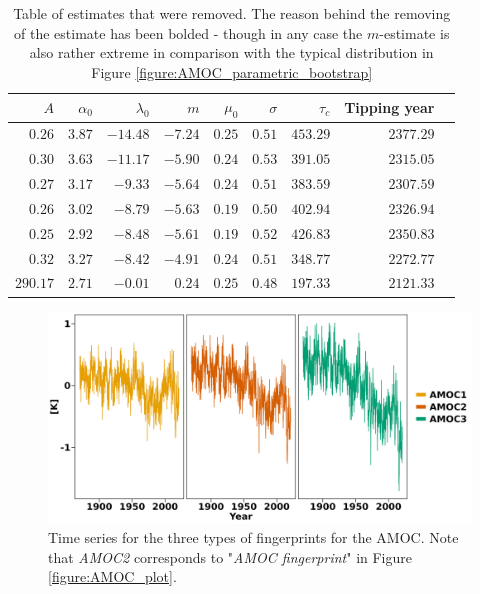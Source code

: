     \begin{table}[ht]
        \centering
        \begin{tabular}{rrrrrrrrr}
            \hline
            $A$ & $\alpha_0$ & $\lambda_0$ & $m$ & $\mu_0$ & $\sigma$ & $\tau_c$ & Tipping year \\ 
            \hline
            $0.26$ & $3.87$ & $\mathbf{-14.48}$ & $-7.24$ & $0.25$ & $0.51$ & $453.29$ & $2377.29$ \\ 
            $0.30$ & $3.63$ & $\mathbf{-11.17}$ & $-5.90$ & $0.24$ & $0.53$ & $391.05$ & $2315.05$ \\ 
            $0.27$ & $3.17$ & $\mathbf{-9.33}$ & $-5.64$ & $0.24$ & $0.51$ & $383.59$ & $2307.59$ \\ 
            $0.26$ & $3.02$ & $\mathbf{-8.79}$ & $-5.63$ & $0.19$ & $0.50$ & $402.94$ & $2326.94$ \\ 
            $0.25$ & $2.92$ & $\mathbf{-8.48}$ & $-5.61$ & $0.19$ & $0.52$ & $426.83$ & $2350.83$ \\ 
            $0.32$ & $3.27$ & $\mathbf{-8.42}$ & $-4.91$ & $0.24$ & $0.51$ & $348.77$ & $2272.77$ \\ 
            $\mathbf{290.17}$ & $2.71$ & $-0.01$ & $0.24$& $0.25$ & $0.48$ & $197.33$ & $2121.33$ \\ 
             \hline
        \end{tabular}
        \caption{Table of estimates that were removed. The reason behind the removing of the estimate has been bolded - though in any case the $m$-estimate is also rather extreme in comparison with the typical distribution in Figure \ref{figure:AMOC_parametric_bootstrap}}
        \label{table:extreme_amoc_estimates}
    \end{table}
    \begin{figure}[h!]
        \begin{center}
            \includegraphics[scale = .1]{figures/AMOC_alt_plot.jpeg}
            \caption{Time series for the three types of fingerprints for the AMOC. Note that \textit{AMOC2} corresponds to "\textit{AMOC fingerprint}" in Figure \ref{figure:AMOC_plot}.}
            \label{figure:allAMOCFingerprints}
        \end{center}
    \end{figure}
\clearpage
